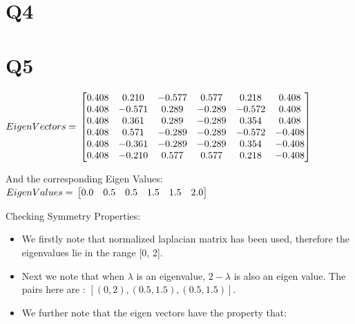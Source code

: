 \documentclass{article}
\begin{document}
\section*{Q4}


\section*{Q5}
$Eigen Vectors =  \\
\begin{bmatrix}
  0.408 & 0.210 & -0.577 & 0.577 & 0.218 & 0.408 \\
  0.408 & -0.571 & 0.289 & -0.289 & -0.572 & 0.408 \\
  0.408 & 0.361 & 0.289 & -0.289 & 0.354 & 0.408 \\
  0.408 & 0.571 & -0.289 & -0.289 & -0.572 & -0.408 \\
  0.408 & -0.361 & -0.289 & -0.289 & 0.354 & -0.408 \\
  0.408 & -0.210 & 0.577 & 0.577 & 0.218 & -0.408
\end{bmatrix}$

And the corresponding Eigen Values:
$Eigen Values = \\
\begin{bmatrix}
  0.0 & 0.5 & 0.5 & 1.5 & 1.5 & 2.0
\end{bmatrix}
$

Checking Symmetry Properties:
\begin{itemize}
\item We firstly note that normalized laplacian matrix has been used, therefore the eigenvalues lie in the range [0, 2].
\item Next we note that when $\lambda$ is an eigenvalue, $2-\lambda$ is also an eigen value. The pairs here are : $[(0, 2), (0.5, 1.5), (0.5, 1.5)]$.
\item We further note that the eigen vectors have the property that:

\end{itemize}
\end{document}
